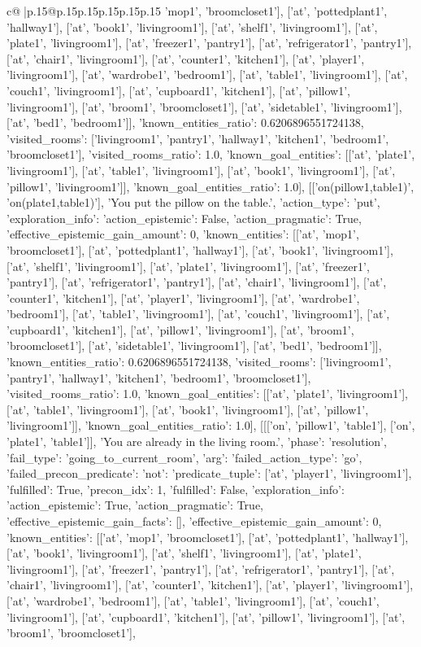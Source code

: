 \documentclass{article}
\begin{document}
{\begin{supertabular}{c@{$\;$}|p{.15\linewidth}@{}p{.15\linewidth}p{.15\linewidth}p{.15\linewidth}p{.15\linewidth}p{.15\linewidth}}
{{{'mop1', 'broomcloset1'], ['at', 'pottedplant1', 'hallway1'], ['at', 'book1', 'livingroom1'], ['at', 'shelf1', 'livingroom1'], ['at', 'plate1', 'livingroom1'], ['at', 'freezer1', 'pantry1'], ['at', 'refrigerator1', 'pantry1'], ['at', 'chair1', 'livingroom1'], ['at', 'counter1', 'kitchen1'], ['at', 'player1', 'livingroom1'], ['at', 'wardrobe1', 'bedroom1'], ['at', 'table1', 'livingroom1'], ['at', 'couch1', 'livingroom1'], ['at', 'cupboard1', 'kitchen1'], ['at', 'pillow1', 'livingroom1'], ['at', 'broom1', 'broomcloset1'], ['at', 'sidetable1', 'livingroom1'], ['at', 'bed1', 'bedroom1']], 'known_entities_ratio': 0.6206896551724138, 'visited_rooms': ['livingroom1', 'pantry1', 'hallway1', 'kitchen1', 'bedroom1', 'broomcloset1'], 'visited_rooms_ratio': 1.0, 'known_goal_entities': [['at', 'plate1', 'livingroom1'], ['at', 'table1', 'livingroom1'], ['at', 'book1', 'livingroom1'], ['at', 'pillow1', 'livingroom1']], 'known_goal_entities_ratio': 1.0}}], [['on(pillow1,table1)', 'on(plate1,table1)'], 'You put the pillow on the table.', {'action_type': 'put', 'exploration_info': {'action_epistemic': False, 'action_pragmatic': True, 'effective_epistemic_gain_amount': 0, 'known_entities': [['at', 'mop1', 'broomcloset1'], ['at', 'pottedplant1', 'hallway1'], ['at', 'book1', 'livingroom1'], ['at', 'shelf1', 'livingroom1'], ['at', 'plate1', 'livingroom1'], ['at', 'freezer1', 'pantry1'], ['at', 'refrigerator1', 'pantry1'], ['at', 'chair1', 'livingroom1'], ['at', 'counter1', 'kitchen1'], ['at', 'player1', 'livingroom1'], ['at', 'wardrobe1', 'bedroom1'], ['at', 'table1', 'livingroom1'], ['at', 'couch1', 'livingroom1'], ['at', 'cupboard1', 'kitchen1'], ['at', 'pillow1', 'livingroom1'], ['at', 'broom1', 'broomcloset1'], ['at', 'sidetable1', 'livingroom1'], ['at', 'bed1', 'bedroom1']], 'known_entities_ratio': 0.6206896551724138, 'visited_rooms': ['livingroom1', 'pantry1', 'hallway1', 'kitchen1', 'bedroom1', 'broomcloset1'], 'visited_rooms_ratio': 1.0, 'known_goal_entities': [['at', 'plate1', 'livingroom1'], ['at', 'table1', 'livingroom1'], ['at', 'book1', 'livingroom1'], ['at', 'pillow1', 'livingroom1']], 'known_goal_entities_ratio': 1.0}}], [[['on', 'pillow1', 'table1'], ['on', 'plate1', 'table1']], 'You are already in the living room.', {'phase': 'resolution', 'fail_type': 'going_to_current_room', 'arg': {'failed_action_type': 'go', 'failed_precon_predicate': {'not': {'predicate_tuple': ['at', 'player1', 'livingroom1'], 'fulfilled': True, 'precon_idx': 1}, 'fulfilled': False}}, 'exploration_info': {'action_epistemic': True, 'action_pragmatic': True, 'effective_epistemic_gain_facts': [], 'effective_epistemic_gain_amount': 0, 'known_entities': [['at', 'mop1', 'broomcloset1'], ['at', 'pottedplant1', 'hallway1'], ['at', 'book1', 'livingroom1'], ['at', 'shelf1', 'livingroom1'], ['at', 'plate1', 'livingroom1'], ['at', 'freezer1', 'pantry1'], ['at', 'refrigerator1', 'pantry1'], ['at', 'chair1', 'livingroom1'], ['at', 'counter1', 'kitchen1'], ['at', 'player1', 'livingroom1'], ['at', 'wardrobe1', 'bedroom1'], ['at', 'table1', 'livingroom1'], ['at', 'couch1', 'livingroom1'], ['at', 'cupboard1', 'kitchen1'], ['at', 'pillow1', 'livingroom1'], ['at', 'broom1', 'broomcloset1'], }}}
\end{supertabular}}
\end{document}
